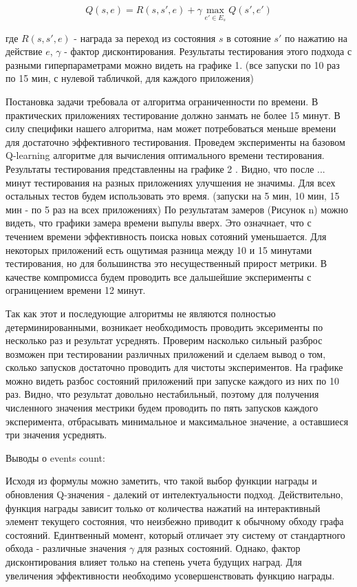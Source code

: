 $$Q(s, e) = R(s, s', e) + \gamma \max_{e' \in E_s} Q(s', e')$$

где $R(s, s', e)$ - награда за переход из состояния $s$ в сотояние $s'$ по нажатию на действие $e$, $\gamma$ - фактор дисконтирования. Результаты тестирования этого подхода с разными гиперпараметрами можно видеть на графике 1. (все запуски по 10 раз по 15 мин, с нулевой табличкой, для каждого приложения)

Постановка задачи требовала от алгоритма ограниченности по времени. В практических приложениях тестирование должно занмать не более 15 минут. В силу специфики нашего алгоритма, нам может потребоваться меньше времени для достаточно эффективного тестирования. Проведем эксперименты на базовом Q-learning алгоритме для вычисления оптимального времени тестирования. Результаты тестирования представленны на графике 2 . Видно, что после ... минут тестирования на разных приложениях улучшения не значимы. Для всех остальных тестов будем использовать это время.
(запуски на 5 мин, 10 мин, 15 мин - по 5 раз на всех приложениях)
По результатам замеров (Рисунок n) можно видеть, что графики замера времени выпулы вверх. Это означнает, что с течением времени эффективность поиска новых сотояний уменьшается. Для некоторых приложений есть ощутимая разница между 10 и 15 минутами тестирования, но для большинства это несущественный прирост метрики. В качестве компромисса будем проводить все дальшейшие эксперименты с ограницением времени 12 минут.

Так как этот и последующие алгоритмы не являются полностью детерминированными, возникает необходимость проводить эксерименты по несколько раз и результат усреднять. Проверим насколько сильный разброс возможен при тестировании различных приложений и сделаем вывод о том, сколько запусков достаточно проводить для чистоты экспериментов. На графике можно видеть разбос состояний приложений при запуске каждого из них по 10 раз. Видно, что результат довольно нестабильный, поэтому для получения численного значения местрики будем проводить по пять запусков каждого эксперимента, отбрасывать минимальное и максимальное значение, а оставшиеся три значения усреднять.

Выводы о events count:

Исходя из формулы можно заметить, что такой выбор функции награды и обновления Q-значения - далекий от интелектуальности подход. Действительно, функция награды зависит только от количества нажатий на интерактивный элемент текущего состояния, что неизбежно приводит к обычному обходу графа состояний. Единтвенный момент, который отличает эту систему от стандартного обхода - различные значения $\gamma$ для разных состояний. Однако, фактор дисконтирования влияет только на степень учета будущих наград. Для увеличения эффективности необходимо усовершенствовать функцию награды.


